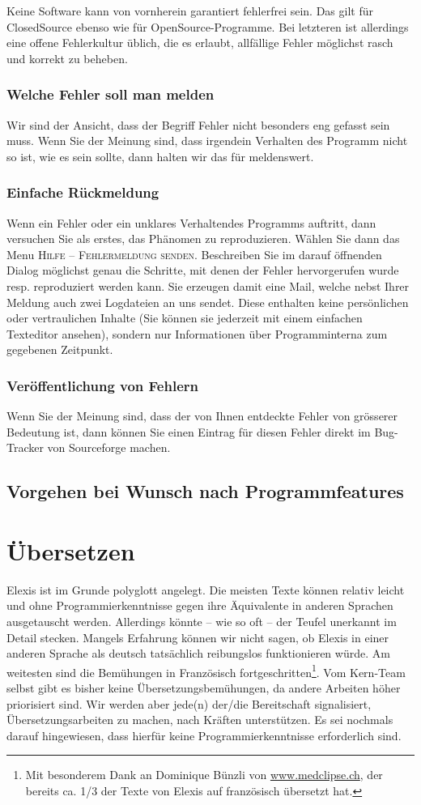 Keine Software kann von vornherein garantiert fehlerfrei sein. Das gilt für
ClosedSource ebenso wie für OpenSource-Programme. Bei letzteren ist allerdings
eine offene Fehlerkultur üblich, die es erlaubt, allfällige Fehler möglichst
rasch und korrekt zu beheben.
\subsection{Welche Fehler soll man melden}
Wir sind der Ansicht, dass der Begriff \glqq Fehler\grqq{} nicht besonders eng
gefasst sein muss. Wenn Sie der Meinung sind, dass irgendein Verhalten des
Programm nicht so ist, wie es sein sollte, dann halten wir das für meldenswert.
\subsection{Einfache Rückmeldung}
Wenn ein Fehler oder ein \glqq unklares Verhalten\grqq{}des Programms auftritt,
dann versuchen Sie als erstes, das Phänomen zu reproduzieren. Wählen Sie dann
das Menu \textsc{Hilfe -- Fehlermeldung senden}. Beschreiben Sie im darauf
öffnenden Dialog möglichst genau die Schritte, mit denen der Fehler
hervorgerufen wurde resp. reproduziert werden kann. Sie erzeugen damit eine
Mail, welche nebst Ihrer Meldung auch zwei Logdateien an uns sendet. Diese
enthalten keine persönlichen oder vertraulichen Inhalte (Sie können sie
jederzeit mit einem einfachen Texteditor ansehen), sondern nur Informationen
über Programminterna zum gegebenen Zeitpunkt.
\subsection{Veröffentlichung von Fehlern}
Wenn Sie der Meinung sind, dass der von Ihnen entdeckte Fehler von grösserer
Bedeutung ist, dann können Sie einen Eintrag für diesen Fehler direkt im
Bug-Tracker von Sourceforge machen.
\section{Vorgehen bei Wunsch nach Programmfeatures}

\chapter{Übersetzen}
Elexis ist im Grunde polyglott angelegt. Die meisten Texte können relativ leicht
und ohne Programmierkenntnisse gegen ihre Äquivalente in anderen Sprachen
ausgetauscht werden. Allerdings könnte -- wie so oft -- der Teufel unerkannt im
Detail stecken. Mangels Erfahrung können wir nicht sagen, ob Elexis in einer
anderen Sprache als deutsch tatsächlich reibungslos funktionieren würde. Am
weitesten sind die Bemühungen in Französisch fortgeschritten\footnote{Mit
besonderem Dank an Dominique Bünzli von
\href{http://www.medclipse.ch}{www.medclipse.ch}, der bereits ca. 1/3 der Texte
von Elexis auf französisch übersetzt hat.}.
Vom Kern-Team selbst gibt es bisher keine Übersetzungsbemühungen, da andere
Arbeiten höher priorisiert sind. Wir werden aber jede(n) der/die Bereitschaft
signalisiert, Übersetzungsarbeiten zu machen, nach Kräften unterstützen. Es sei
nochmals darauf hingewiesen, dass hierfür keine Programmierkenntnisse
erforderlich sind.

